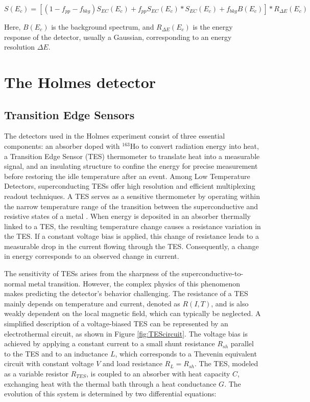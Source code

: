 \begin{equation}
S(E_c) = \left[ (1-f_{pp}-f_{bkg})S_{EC}(E_c) + f_{pp} S_{EC}(E_c) * S_{EC}(E_c) + f_{bkg}B(E_c) \right] * R_{\Delta E}(E_c)
\end{equation}

Here, \(B(E_c)\) is the background spectrum, and \(R_{\Delta E}(E_c)\) is the energy response of the detector, usually
a Gaussian, corresponding to
an energy resolution \(\Delta E\).
\section{The Holmes detector}
\subsection{Transition Edge Sensors}\label{sec:TES}

The detectors used in the Holmes experiment consist of three essential components: an absorber doped with $^{163}$Ho to convert radiation
energy into heat, a Transition Edge Sensor (TES) thermometer to translate heat into a measurable signal, and an
insulating structure to confine the energy for precise measurement before restoring the idle temperature after an event. Among Low Temperature Detectors, superconducting TESs offer high resolution and efficient multiplexing readout techniques.
A TES serves as a sensitive thermometer by operating within the narrow temperature range of the transition between the
superconductive and resistive states of a metal \cite{irwin2005TESreview}. When energy is deposited in an absorber
thermally linked
to a TES, the resulting temperature change causes a resistance variation in the
TES. If a constant voltage bias is applied, this change of resistance leads to a measurable drop in the current flowing
through the TES. Consequently, a
change in energy corresponds to an observed change in current.%

The sensitivity of TESs arises from the sharpness of the superconductive-to-normal metal transition. However, the
complex physics of this phenomenon makes predicting the detector's behavior challenging. The resistance of a TES mainly
depends on temperature and current, denoted as $R(I, T)$, and is also weakly dependent on the local magnetic field, which can typically be neglected.
A simplified description of a voltage-biased TES can be represented by an electrothermal circuit, as shown in Figure
\ref{fig:TEScircuit}. The voltage bias is achieved by applying a constant current to a small shunt
resistance $R_{sh}$ parallel to the TES and to an inductance $L$, which corresponds to a Thevenin equivalent circuit with
constant voltage $V$ and load resistance $R_{L}=R_{sh}$. The TES, modeled as a variable resistor $R_{TES}$, is coupled to an
absorber with heat capacity $C$, exchanging heat with the thermal bath through a heat conductance $G$. The evolution of
this system is determined by two differential equations:

